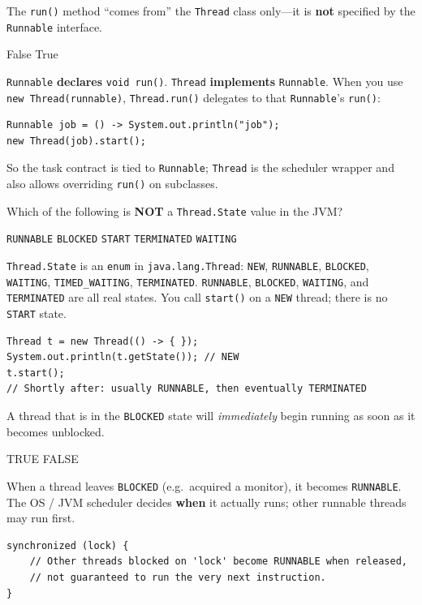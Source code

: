 \question[4]
The \texttt{run()} method ``comes from'' the \texttt{Thread} class only---it is \textbf{not} specified by the \texttt{Runnable} interface.
\begin{choices}
  \CorrectChoice False
  \choice True
\end{choices}
\begin{solution}
  \texttt{Runnable} \textbf{declares} \texttt{void run()}. \texttt{Thread} \textbf{implements} \texttt{Runnable}. When you use \texttt{new Thread(runnable)}, \texttt{Thread.run()} delegates to that \texttt{Runnable}'s \texttt{run()}:

\begin{lstlisting}[style=javaexam]
Runnable job = () -> System.out.println("job");
new Thread(job).start();
\end{lstlisting}

  So the task contract is tied to \texttt{Runnable}; \texttt{Thread} is the scheduler wrapper and also allows overriding \texttt{run()} on subclasses.
\end{solution}

\question[4]
Which of the following is \textbf{NOT} a \texttt{Thread.State} value in the JVM?
\begin{choices}
  \choice \texttt{RUNNABLE}
  \choice \texttt{BLOCKED}
  \CorrectChoice \texttt{START}
  \choice \texttt{TERMINATED}
  \choice \texttt{WAITING}
\end{choices}
\begin{solution}
  \texttt{Thread.State} is an \texttt{enum} in \texttt{java.lang.Thread}: \texttt{NEW}, \texttt{RUNNABLE}, \texttt{BLOCKED}, \texttt{WAITING}, \texttt{TIMED\_WAITING}, \texttt{TERMINATED}. \texttt{RUNNABLE}, \texttt{BLOCKED}, \texttt{WAITING}, and \texttt{TERMINATED} are all real states. You call \texttt{start()} on a \texttt{NEW} thread; there is no \texttt{START} state.

\begin{lstlisting}[style=javaexam]
Thread t = new Thread(() -> { });
System.out.println(t.getState()); // NEW
t.start();
// Shortly after: usually RUNNABLE, then eventually TERMINATED
\end{lstlisting}
\end{solution}

\question[4]
A thread that is in the \texttt{BLOCKED} state will \emph{immediately} begin running as soon as it becomes unblocked.
\begin{choices}
  \choice TRUE
  \CorrectChoice FALSE
\end{choices}
\begin{solution}
  When a thread leaves \texttt{BLOCKED} (e.g.\ acquired a monitor), it becomes \texttt{RUNNABLE}. The OS / JVM scheduler decides \textbf{when} it actually runs; other runnable threads may run first.

\begin{lstlisting}[style=javaexam]
synchronized (lock) {
    // Other threads blocked on 'lock' become RUNNABLE when released,
    // not guaranteed to run the very next instruction.
}
\end{lstlisting}
\end{solution}

